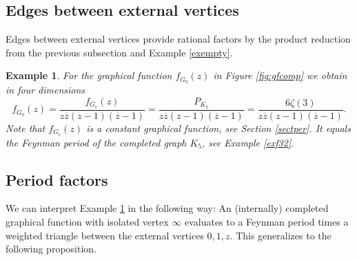 \documentclass[oneside]{amsart}
\newcommand{\zz}{{\overline{z}}}
\theoremstyle{plain}
\newtheorem{ex}[thm]{Example}
\begin{document}
\subsection{Edges between external vertices}\label{sectextedge}
Edges between external vertices provide rational factors by the product reduction from the previous subsection and Example \ref{exempty}.

\begin{ex}\label{exf33}
For the graphical function $f_{G_b}(z)$ in Figure \ref{fig:gfcomp} we obtain in four dimensions
$$
f_{G_b}(z)=\frac{f_{G_c}(z)}{z\zz(z-1)(\zz-1)}=\frac{P_{K_5}}{z\zz(z-1)(\zz-1)}=\frac{6\zeta(3)}{z\zz(z-1)(\zz-1)}.
$$
Note that $f_{G_c}(z)$ is a constant graphical function, see Section \ref{sectper}. It equals the Feynman period of the completed graph $K_5$, see Example \ref{exf32}.
\end{ex}

\subsection{Period factors}\label{sectfactor}

We can interpret Example \ref{exf33} in the following way: An (internally) completed graphical function with isolated vertex $\infty$ evaluates to a Feynman period
times a weighted triangle between the external vertices $0,1,z$. This generalizes to the following proposition.
\end{document}
